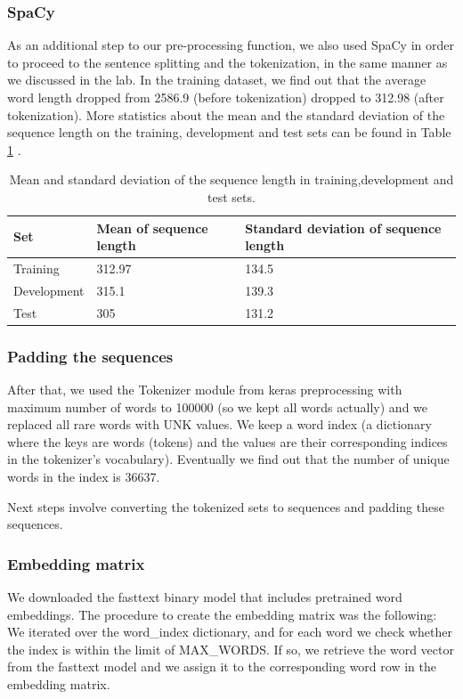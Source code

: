 \documentclass[10pt, a4paper]{article}
\begin{document}
	
	\subsubsection{SpaCy}
	As an additional step to our pre-processing function, we also used SpaCy in order to proceed to the sentence splitting and the tokenization, in the same manner as we discussed in the lab. In the training dataset, we find out that the average word length dropped from 2586.9 (before tokenization) dropped to 312.98 (after tokenization). More statistics about the mean and the standard deviation of the sequence length on the training, development and test sets can be found in Table \ref{tab::ex-1-stats} .
	
	\begin{table}
		\begin{tabular}{|l|l|l|}
			\hline
			\cellcolor{blue!25}\textbf{Set} & \cellcolor{blue!25}\textbf{Mean of sequence length} &
			\cellcolor{blue!25}\textbf{Standard deviation of sequence length}\\
			\hline
			Training & 312.97 & 134.5 \\\hline
			Development & 315.1  & 139.3 \\\hline
			Test & 305 & 131.2 \\\hline
		\end{tabular}
		\centering
		\caption{Mean and standard deviation of the sequence length in training,development and test sets.}
		\label{tab::ex-1-stats}
	\end{table}
	
	
	
	\subsubsection{Padding the sequences}
	After that, we used the Tokenizer module from keras preprocessing with maximum number of words to 100000 (so we kept all words actually) and we replaced all rare words with UNK values. We keep a word index (a dictionary where the keys are words (tokens) and the values are their corresponding indices in the tokenizer's vocabulary). Eventually we find out that the number of unique words in the index is 36637.
	
	Next steps involve converting the tokenized sets to sequences and padding these sequences.
	
	\subsubsection{Embedding matrix}
	We downloaded the fasttext binary model that includes pretrained word embeddings. The procedure to create the embedding matrix was the following: We iterated over the word\_index dictionary, and for each word we check whether the index is within the limit of MAX\_WORDS. If so, we retrieve the word vector from the fasttext model and we assign it to the corresponding word row in the embedding matrix.
	
\end{document}
